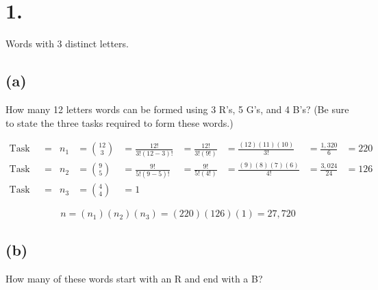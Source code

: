 

\renewcommand\assignment{Worksheet 5, Wednesday due 1 February, 4:15pm}


    \section*{1.}
    Words with 3 distinct letters.

    \subsection*{(a)}
    How many 12 letters words can be formed using 3 R's, 5 G's, and 4 B's? (Be sure to state the three tasks required to form these words.)

    \begin{mdframed}
        \begin{align*}
            \text{Task 1: Assign the 3 R's} & = & n_1 & = {12 \choose 3} & = \frac{12!}{3!(12-3)!} & = \frac{12!}{3!(9!)} & = \frac{(12)(11)(10)}{3!} & = \frac{1,320}{6} & = 220 \\
            \text{Task 2: Assign the 5 G's} & = & n_2 & = {9 \choose 5} & = \frac{9!}{5!(9-5)!} & = \frac{9!}{5!(4!)} & = \frac{(9)(8)(7)(6)}{4!} & = \frac{3,024}{24} & = 126 \\
            \text{Task 3: Assign the 4 B's} & = & n_3 & = {4 \choose 4} & = 1 & 
    \end{align*}

    \begin{equation*}
        n = (n_1)(n_2)(n_3) = (220)(126)(1) = \boxed{27,720}
    \end{equation*}

    \end{mdframed}

    \subsection*{(b)}
    How many of these words start with an R and end with a B?

